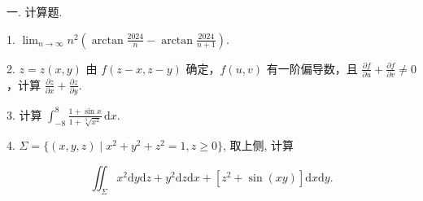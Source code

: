\documentclass{examcollection}
\renewcommand{\displayformula}[1]{\[#1\]}
\begin{document}
{\begin{minipage}{\textwidth}
\smallskip
一. 计算题.\par
1. $\lim_{n\to \infty}n^2\left(\arctan{\frac{2024}{n}} -\arctan{\frac{2024}{n + 1}}\right).$\par
2. $z = z(x,y)$ 由 $f(z - x,z - y)$ 确定，$f(u,v)$ 有一阶偏导数，且 $\frac{\partial f}{\partial u} + \frac{\partial f}{\partial v} \neq 0$，计算 $\frac{\partial z}{\partial x} + \frac{\partial z}{\partial y}$.\par
3. 计算 $\int_{-8}^{8} \frac{1 + \sin x}{1 + \sqrt[3]{x^2}} \, \mathrm{d}x$.\par
4. $\Sigma = \{(x, y, z) \mid x^2 + y^2 + z^2 = 1, z \geq 0\}$, 取上侧, 计算\par
\displayformula{\iint_ {\Sigma} x ^ {2} \mathrm{d} y \mathrm{d} z + y ^ {2} \mathrm{d} z \mathrm{d} x + [ z ^ {2} + \sin (x y) ] \mathrm{d} x \mathrm{d} y.}\par
\end{minipage}}
\ifdim\dimexpr\ht\proofbox+\dp\proofbox\relax>\textheight
\noindent\resizebox{!}{\textheight}{\usebox{\proofbox}}\else\noindent\usebox{\proofbox}\fi\clearpage
\end{document}
